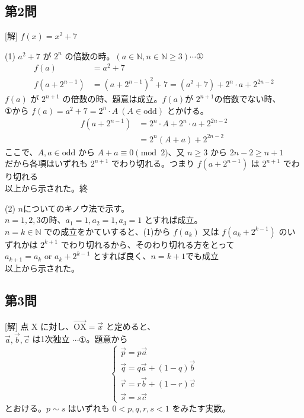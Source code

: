 \documentclass[../main.tex]{subfiles}
\begin{document}
\subsection*{第2問}
[解] $f(x) = x^2+7$

(1) $a^2+7$ が $2^n$ の倍数の時。$(a \in \mathbb{N}, n \in \mathbb{N} \ge 3) \cdots \text{①}$
\begin{align*}
  f(a) &= a^2+7 \\
  f(a+2^{n-1}) &= (a+2^{n-1})^2+7 = (a^2+7) + 2^n \cdot a + 2^{2n-2}
\end{align*}
$f(a)$ が $2^{n+1}$ の倍数の時、題意は成立。$f(a)$が $2^{n+1}$の倍数でない時、\\
①から $f(a) = a^2+7 = 2^n \cdot A \ (A \in \text{odd})$ とかける。
\begin{align*}
  f(a+2^{n-1}) &= 2^n \cdot A + 2^n \cdot a + 2^{2n-2} \\
  &= 2^n (A+a) + 2^{2n-2}
\end{align*}
ここで、$A, a \in \text{odd}$ から $A+a \equiv 0 \pmod 2$、又 $n \ge 3$ から $2n-2 \ge n+1$\\
だから各項はいずれも $2^{n+1}$ でわり切れる。つまり $f(a+2^{n-1})$ は $2^{n+1}$ でわり切れる\\
以上から示された。終

(2) $n$についてのキノウ法で示す。\\
$n=1,2,3$の時、$a_1=1, a_2=1, a_3=1$ とすれば成立。\\
$n=k \in \mathbb{N}$ での成立をかていすると、(1)から $f(a_k)$ 又は $f(a_k+2^{k-1})$ のいずれかは $2^{k+1}$ でわり切れるから、そのわり切れる方をとって $a_{k+1} = a_k \text{ or } a_k+2^{k-1}$ とすれば良く、$n=k+1$でも成立\\
以上から示された。

\subsection*{第3問}
[解] 点 $\text{X}$ に対し、$\overrightarrow{\text{OX}} = \vec{x}$ と定めると、\\
$\vec{a}, \vec{b}, \vec{c}$ は1次独立 $\cdots \text{①}$。題意から
\[
  \begin{cases}
    \vec{p} = p\vec{a} \\
    \vec{q} = q\vec{a} + (1-q)\vec{b} \\
    \vec{r} = r\vec{b} + (1-r)\vec{c} \\
    \vec{s} = s\vec{c}
  \end{cases}
\]
とおける。$p \sim s$ はいずれも $0 < p,q,r,s < 1$ をみたす実数。
\end{document}
